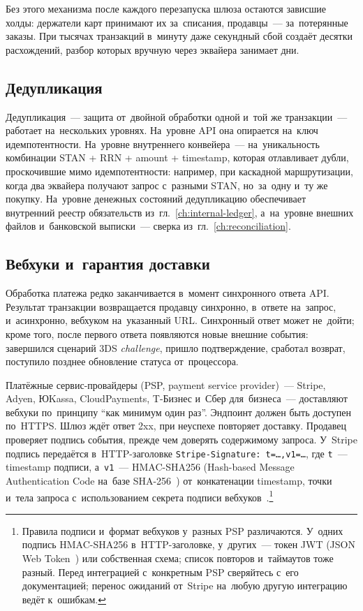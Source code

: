 Без этого механизма после каждого перезапуска шлюза остаются зависшие холды:
держатели карт принимают их за~списания, продавцы~--- за~потерянные заказы.
При тысячах транзакций в~минуту даже секундный сбой создаёт десятки
расхождений, разбор которых вручную через эквайера занимает дни.

\subsection*{Дедупликация}

Дедупликация~--- защита от~двойной обработки одной и~той же транзакции~---
работает на~нескольких уровнях. На~уровне API она опирается на~ключ идемпотентности.
На~уровне внутреннего конвейера~--- на~уникальность комбинации STAN + RRN +
amount + timestamp, которая отлавливает дубли, проскочившие мимо
идемпотентности: например, при каскадной маршрутизации, когда два эквайера
получают запрос с~разными STAN, но~за~одну и~ту же покупку. На~уровне денежных
состояний дедупликацию обеспечивает внутренний реестр обязательств
из~гл.~\ref{ch:internal-ledger}, а~на~уровне внешних файлов и~банковской
выписки~--- сверка из~гл.~\ref{ch:reconciliation}.

\subsection*{Вебхуки и~гарантия доставки}

Обработка платежа редко заканчивается в~момент синхронного ответа API. Результат
транзакции возвращается продавцу синхронно, в~ответе на~запрос,
и~асинхронно, вебхуком на~указанный URL.
Синхронный ответ может не~дойти; кроме того, после первого ответа появляются
новые внешние события: завершился сценарий 3DS \textit{challenge}, пришло подтверждение, сработал
возврат, поступило позднее обновление статуса от~процессора.

Платёжные сервис-провайдеры (PSP, payment service provider)~--- Stripe, Adyen,
ЮKassa, CloudPayments, T-Бизнес и~Сбер для~бизнеса~--- доставляют вебхуки
по~принципу \enquote{как минимум один раз}.
Эндпоинт должен быть доступен по~HTTPS. Шлюз ждёт ответ 2xx, при неуспехе
повторяет доставку. Продавец проверяет подпись события, прежде чем доверять
содержимому запроса. У~Stripe подпись передаётся
в~HTTP-заголовке \texttt{Stripe-Signature: t=\dots,v1=\dots}, где
\texttt{t}~--- timestamp подписи, а~\texttt{v1}~--- HMAC-SHA256 (Hash-based
Message Authentication Code на~базе SHA-256~\cite{rfc-2104}) от~конкатенации
timestamp, точки и~тела запроса с~использованием секрета подписи
вебхуков~\cite{stripe-webhooks}.\footnote{Правила подписи и~формат вебхуков
  у~разных PSP различаются. У~одних подпись HMAC-SHA256 в~HTTP-заголовке,
  у~других~--- токен JWT (JSON Web Token~\cite{rfc-7519}) или собственная схема;
  список повторов и~таймаутов тоже разный. Перед интеграцией с~конкретным PSP
  сверяйтесь с~его документацией; перенос ожиданий от~Stripe на~любую другую
интеграцию ведёт к~ошибкам.}

